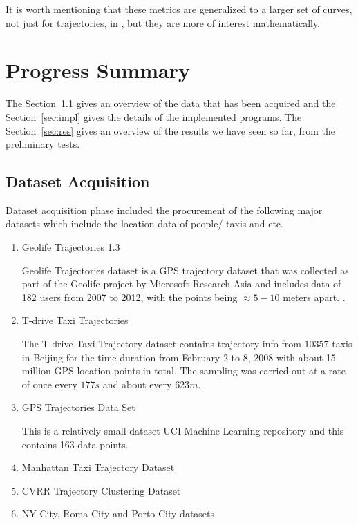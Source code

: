 \documentclass[11pt,a4paper,twocolumn]{article}%
\begin{document}
It is worth mentioning that these metrics are generalized to a larger set of curves, not just for trajectories, in \citep{phillips2019sketched}, but they are more of interest mathematically. 


\section{Progress Summary}

The Section~\ref{sec:data} gives an overview of the data that has been acquired and the Section~\ref{sec:impl} gives the details of the implemented programs. The Section~\ref{sec:res} gives an overview of the results we have seen so far, from the preliminary tests.

\subsection{Dataset Acquisition}\label{sec:data}

Dataset acquisition phase included the procurement of the following major datasets which include the location data of people/ taxis and etc.

\begin{enumerate}
    \item Geolife Trajectories 1.3~\citep{zheng2008understanding,zheng2009mining,zheng2010geolife}
    
    Geolife Trajectories dataset is a GPS trajectory dataset that was collected as part of the Geolife project by Microsoft Research Asia and includes data of 182 users from 2007 to 2012, with the points being $\approx 5-10$ meters apart. .
    
    \item T-drive Taxi Trajectories~\citep{yuan2010t-drive}
    
    The T-drive Taxi Trajectory dataset contains trajectory info from 10357 taxis in Beijing for the time duration from February 2 to 8, 2008 with about 15 million GPS location points in total. The sampling was carried out at a rate of once every $177s$ and about every $623m$.
    
    \item GPS Trajectories Data Set~\citep{cruz2015}
    
    This is a relatively small dataset UCI Machine Learning repository and this contains 163 data-points.
    
    \item Manhattan Taxi Trajectory Dataset ~\citep{Benson-2017-spacey}
    
    \item CVRR Trajectory Clustering Dataset ~\citep{brendan2009}
    
    \item NY City, Roma City and Porto City datasets
\end{enumerate}
\end{document}
